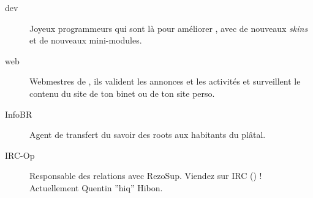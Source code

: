 \begin{description}
  \item[dev]{Joyeux programmeurs qui sont là pour améliorer \fkz, avec de nouveaux \emph{skins} et de nouveaux mini-modules.}


  \item[web] {Webmestres de \fkz, ils valident les annonces et les activités et surveillent le contenu du site de ton binet ou de ton site perso.}


  \item[InfoBR]{Agent de transfert du savoir des roots aux habitants du plâtal.}



  \item[IRC-Op]{Responsable des relations avec RezoSup. Viendez sur IRC () ! \linebreak Actuellement Quentin ''hiq'' Hibon.}




\end{description}

